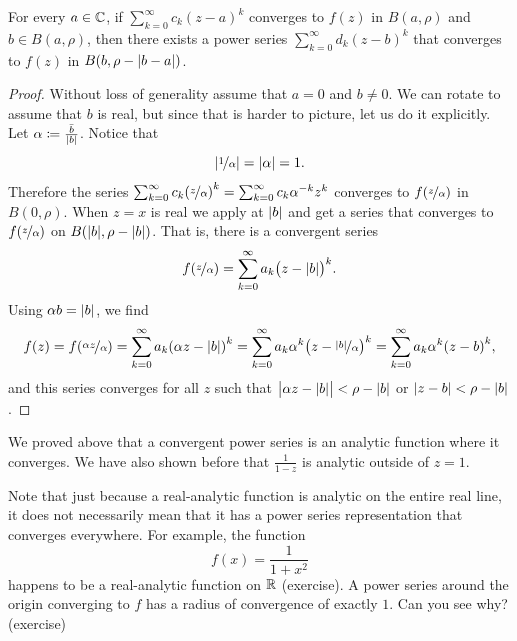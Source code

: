 \begin{cor} \label{cor:powerseranalytic}
For every $a \in {\mathbb{C}}$,
if $\sum_{k=0}^\infty c_k {(z-a)}^k$ converges to $f(z)$ in $B(a,\rho)$ and $b \in
B(a,\rho)$,
then there exists a power series
$\sum_{k=0}^\infty d_k {(z-b)}^k$ that converges to $f(z)$ in $B(b,\rho-\lvert {b-a} \rvert)$.
\end{cor}

\begin{proof}
Without loss of generality assume that $a=0$ and $b \neq 0$.  We can rotate to assume that $b$ is real, but
since that is harder to picture, let us do it explicitly.
Let $\alpha \coloneqq \frac{\bar{b}}{\lvert {b} \rvert}$.
Notice that
\begin{equation*}
\left\lvert {\nicefrac{1}{\alpha}} \right\rvert = \lvert {\alpha} \rvert
= 1 .
\end{equation*}
Therefore the series
$\sum_{k=0}^\infty c_k {(\nicefrac{z}{\alpha})}^k = 
\sum_{k=0}^\infty c_k \alpha^{-k} {z}^k$
converges to $f(\nicefrac{z}{\alpha})$ in $B(0,\rho)$.
When $z=x$ is real
we apply  at $\lvert {b} \rvert$ and get
a series that converges
to $f(\nicefrac{z}{\alpha})$ on $B(\lvert {b} \rvert,\rho-\lvert {b} \rvert)$.
That is, there is a convergent series
\begin{equation*}
f(\nicefrac{z}{\alpha}) =
\sum_{k=0}^\infty a_k {\bigl(z - \lvert {b} \rvert\bigr)}^k .
\end{equation*}
Using $\alpha b = \lvert {b} \rvert$, we find
\begin{equation*}
f(z) = f(\nicefrac{\alpha z}{\alpha}) =
\sum_{k=0}^\infty a_k {(\alpha z - \lvert {b} \rvert)}^k 
=
\sum_{k=0}^\infty a_k\alpha^k {\bigl(z - \nicefrac{\lvert {b} \rvert}{\alpha}\bigr)}^k
=
\sum_{k=0}^\infty a_k\alpha^k {(z - b)}^k ,
\end{equation*}
and this series converges for all $z$ such that
$\bigl\lvert \alpha z-\lvert {b} \rvert\bigr\rvert < \rho-\lvert {b} \rvert$
or $\lvert {z - b} \rvert < \rho-\lvert {b} \rvert$.
\end{proof}

We proved above that a convergent power series is an
analytic function where it converges.  We have also shown before that
$\frac{1}{1-z}$ is analytic outside of $z=1$.

Note that just because a real-analytic function is analytic on the
entire real line, it does not necessarily mean that it has a power series
representation that converges everywhere.  For example, the function
\begin{equation*}
f(x) = \frac{1}{1+x^2}
\end{equation*}
happens to be a real-analytic function on ${\mathbb{R}}$ (exercise).  A power
series around the origin converging to $f$
has a radius of convergence of exactly $1$.
Can you see why? (exercise)

